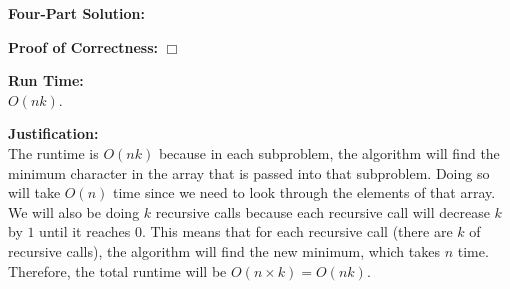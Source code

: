 \documentclass[11pt]{article}
\def\endproofmark{$\Box$}
\newenvironment{FourPartSolution}{\par{\bf Four-Part Solution:}}{\smallskip}
\newenvironment{proofOfCorrectness}{\par{\bf Proof of Correctness:}}{\endproofmark\smallskip}
\newenvironment{runTime}{\par{\bf Run Time:}}{\smallskip}
\newenvironment{justification}{\par{\bf Justification:}}{\smallskip}
\begin{document}
\begin{FourPartSolution}
\begin{proofOfCorrectness}
\end{proofOfCorrectness}
\\
\begin{runTime}
\\
$O(nk)$.
\end{runTime}
\\
\begin{justification}
\\
The runtime is $O(nk)$ because in each subproblem, the algorithm will find the minimum character in the array that is passed into that subproblem. Doing so will take $O(n)$ time since we need to look through the elements of that array. We will also be doing $k$ recursive calls because each recursive call will decrease $k$ by $1$ until it reaches $0$. This means that for each recursive call (there are $k$ of recursive calls), the algorithm will find the new minimum, which takes $n$ time. Therefore, the total runtime will be $O(n \times k) = O(nk)$.
\end{justification}
\end{FourPartSolution}
\end{document}
